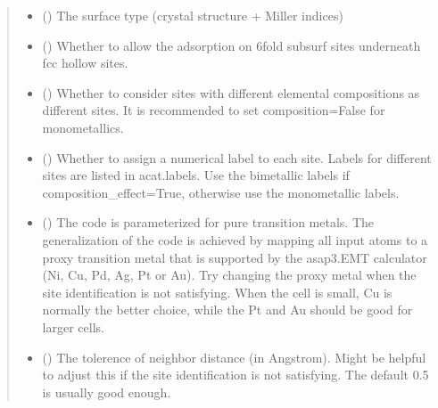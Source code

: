 \documentclass[letterpaper,10pt,english]{sphinxmanual}
\begin{document}
\begin{fulllineitems}
\begin{quote}
\begin{description}
\begin{itemize}
\item {} 
 () \textendash{} The surface type (crystal structure + Miller indices)

\item {} 
 (\sphinxstyleliteralemphasis{\sphinxupquote{, }}) \textendash{} Whether to allow the adsorption on 6\sphinxhyphen{}fold subsurf sites
underneath fcc hollow sites.

\item {} 
 (\sphinxstyleliteralemphasis{\sphinxupquote{, }}) \textendash{} Whether to consider sites with different elemental
compositions as different sites. It is recommended to
set composition=False for monometallics.

\item {} 
 (\sphinxstyleliteralemphasis{\sphinxupquote{, }}) \textendash{} Whether to assign a numerical label to each site.
Labels for different sites are listed in acat.labels.
Use the bimetallic labels if composition\_effect=True,
otherwise use the monometallic labels.

\item {} 
 (\sphinxstyleliteralemphasis{\sphinxupquote{, }}) \textendash{} The code is parameterized for pure transition metals.
The generalization of the code is achieved by mapping all
input atoms to a proxy transition metal that is supported
by the asap3.EMT calculator (Ni, Cu, Pd, Ag, Pt or Au).
Try changing the proxy metal when the site identification
is not satisfying. When the cell is small, Cu is normally
the better choice, while the Pt and Au should be good for
larger cells.

\item {} 
 (\sphinxstyleliteralemphasis{\sphinxupquote{, }}) \textendash{} The tolerence of neighbor distance (in Angstrom).
Might be helpful to adjust this if the site identification
is not satisfying. The default 0.5 is usually good enough.


\end{itemize}
\end{description}
\end{quote}
\end{fulllineitems}
\end{document}
